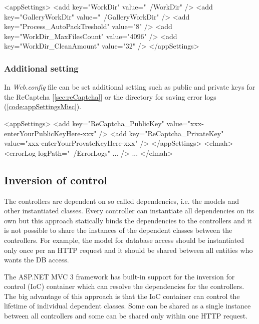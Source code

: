 \begin{XML}[label=code:appSettingsWorkDir,caption={The working directories settings in the \emph{Web.config} file}]
<appSettings>
	<add key="WorkDir" value="~/WorkDir" />
	<add key="GalleryWorkDir" value="~/GalleryWorkDir" />
	<add key="Process_AutoPackTreshold" value="8" />
	<add key="WorkDir_MaxFilesCount" value="4096" />
	<add key="WorkDir_CleanAmount" value="32" />
</appSettings>
\end{XML}


\subsubsection{Additional setting}

In \emph{Web.config} file can be set additional setting such as public and private keys for the ReCaptcha [\ref{sec:reCaptcha}] or the directory for saving error logs (\autoref{code:appSettingsMisc}).


\begin{XML}[label=code:appSettingsMisc,caption={Additional setting in the \emph{Web.config} file}]
<appSettings>
	<add key="ReCaptcha_PublicKey" value="xxx-enterYourPublicKeyHere-xxx" />
	<add key="ReCaptcha_PrivateKey" value="xxx-enterYourProvateKeyHere-xxx" />
</appSettings>
<elmah>
		<errorLog logPath="~/ErrorLogs" ... />
		...
</elmah>		
\end{XML}


\subsection{Inversion of control}

The controllers are dependent on so called dependencies, i.e. the models and other instantiated classes.
Every controller can instantiate all dependencies on its own but this approach statically binds the dependencies to the controllers and it is not possible to share the instances of the dependent classes between the controllers.
For example, the model for database access should be instantiated only once per an HTTP request and it should be shared between all entities who wants the DB access.

The ASP.NET MVC 3 framework has built-in support for the inversion for control (IoC) container which can resolve the dependencies for the controllers.
The big advantage of this approach is that the IoC container can control the lifetime of individual dependent classes.
Some can be shared as a single instance between all controllers and some can be shared only within one HTTP request.

